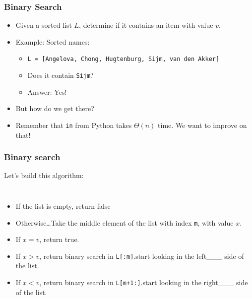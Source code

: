 \begin{frame}
	\frametitle{Binary Search}

			\begin{itemize}
			\item Given a sorted list $L$, determine if it contains an item with value $v$.
			\item Example: Sorted names:
			\begin{itemize}
			\item \texttt{L = [Angelova, Chong, Hugtenburg, Sijm, van den Akker]}
			\item Does it contain \texttt{Sijm}?
			\item Answer: Yes!
			\end{itemize}

			\item \alert{But how do we get there?}
			\item Remember that \texttt{in} from Python takes $\Theta(n)$ time. We want to improve on that!
		\end{itemize}	
\end{frame}

\begin{frame}
	\frametitle{Binary search}
	
		Let's build this algorithm:
		
			\begin{columns}[t]
					
		\begin{itemize}
\item If the list is empty, return false
		\item Otherwise\dots Take the middle element of the list with index \texttt{m}, with value $x$.
		\item If $x = v$, return true.
		
		\item If $x > v$, return binary search in \texttt{L[:m]}.{start looking in the left{\_\_\_} side of the list.}
		\item If $x < v$, return binary search in \texttt{L[m+1:]}.{start looking in the right{\_\_\_} side of the list.}
		\end{itemize}

				

			\end{columns}


\end{frame}

